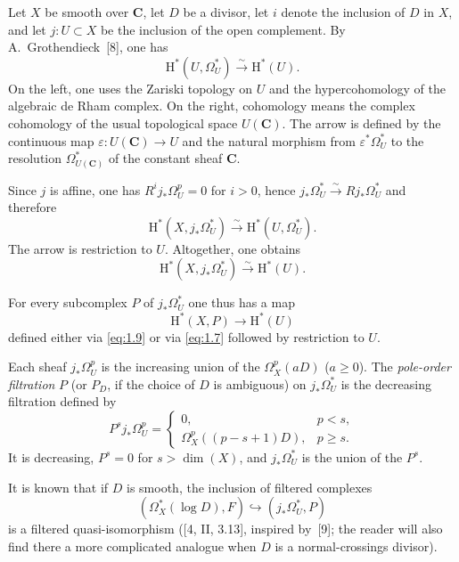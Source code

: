 \documentclass[11pt]{amsart}
\theoremstyle{definition}
\begin{document}
\medskip

Let $X$ be smooth over $\mathbf C$, let $D$ be a divisor, let $i$ denote the inclusion of $D$ in $X$, and let $j:U\subset X$ be the inclusion of the open complement. By A.~Grothendieck~[8], one has
\begin{equation}\label{eq:1.7}
\mathrm H^*(U,\Omega_U^*) \xrightarrow{\sim} \mathrm H^*(U).
\tag{1.7}
\end{equation}
On the left, one uses the Zariski topology on $U$ and the hypercohomology of the algebraic de Rham complex. On the right, cohomology means the complex cohomology of the usual topological space $U(\mathbf C)$. The arrow is defined by the continuous map $\varepsilon:U(\mathbf C)\to U$ and the natural morphism from $\varepsilon^*\Omega_U^*$ to the resolution $\Omega_{U(\mathbf C)}^*$ of the constant sheaf $\mathbf C$.

Since $j$ is affine, one has $R^i j_*\Omega_U^p = 0$ for $i>0$, hence $j_*\Omega_U^*\xrightarrow{\sim} Rj_*\Omega_U^*$ and therefore
\begin{equation}\label{eq:1.8}
\mathrm H^*(X, j_*\Omega_U^*) \xrightarrow{\sim} \mathrm H^*(U,\Omega_U^*).
\tag{1.8}
\end{equation}
The arrow is restriction to $U$. Altogether, one obtains
\begin{equation}\label{eq:1.9}
\mathrm H^*(X, j_*\Omega_U^*) \xrightarrow{\sim} \mathrm H^*(U).
\tag{1.9}
\end{equation}

For every subcomplex $P$ of $j_*\Omega_U^*$ one thus has a map
\[
\mathrm H^*(X,P) \to \mathrm H^*(U)
\]
defined either via \eqref{eq:1.9} or via \eqref{eq:1.7} followed by restriction to $U$.

Each sheaf $j_*\Omega_U^p$ is the increasing union of the $\Omega_X^p(aD)$ ($a\ge 0$). The \emph{pole-order filtration} $P$ (or $P_D$, if the choice of $D$ is ambiguous) on $j_*\Omega_U^*$ is the decreasing filtration defined by
\[
P^s j_*\Omega_U^p =
\begin{cases}
0, & p<s,\\[4pt]
\Omega_X^p((p-s+1)D), & p\ge s.
\end{cases}
\]
It is decreasing, $P^s=0$ for $s>\dim(X)$, and $j_*\Omega_U^*$ is the union of the $P^s$.

It is known that if $D$ is smooth, the inclusion of filtered complexes
\begin{equation}\label{eq:1.10}
(\Omega_X^*(\log D),F) \hookrightarrow (j_*\Omega_U^*,P)
\tag{1.10}
\end{equation}
is a filtered quasi-isomorphism ([4, II, 3.13], inspired by~[9]; the reader will also find there a more complicated analogue when $D$ is a normal-crossings divisor).
\end{document}

